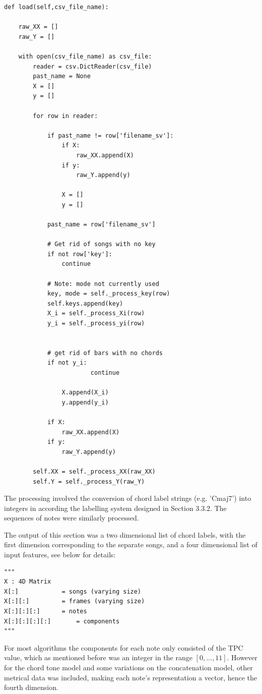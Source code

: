 \documentclass[bsc,singlespacing,parskip,deptreport,twoside,frontabs]{infthesis}
\begin{document}
\begin{lstlisting}[frame=single,caption='Data Loader']
def load(self,csv_file_name):

	raw_XX = []
	raw_Y = []

	with open(csv_file_name) as csv_file:
		reader = csv.DictReader(csv_file)
		past_name = None
		X = []
		y = []

		for row in reader:
			
			if past_name != row['filename_sv']:
				if X:
					raw_XX.append(X)
				if y:
					raw_Y.append(y)

				X = []
				y = []

			past_name = row['filename_sv']

			# Get rid of songs with no key
			if not row['key']:
				continue

			# Note: mode not currently used
			key, mode = self._process_key(row)
			self.keys.append(key)
			X_i = self._process_Xi(row)
			y_i = self._process_yi(row)


			# get rid of bars with no chords
			if not y_i:					
            			continue

				X.append(X_i)
				y.append(y_i)

			if X:
				raw_XX.append(X)
			if y:
				raw_Y.append(y)

		self.XX = self._process_XX(raw_XX)
		self.Y = self._process_Y(raw_Y)
\end{lstlisting}

The processing involved the conversion of chord label strings (e.g. 'Cmaj7') into integers in according the labelling system designed in Section 3.3.2. The sequences of notes were similarly processed.

The output of this section was a two dimensional list of chord labels, with the first dimension corresponding to the separate songs, and a four dimensional list of input features, see below for details:

\begin{lstlisting}[frame=single,caption='Input dimensions']
"""
X :	4D Matrix
X[:]			= songs (varying size)
X[:][:] 		= frames (varying size)
X[:][:][:]		= notes
X[:][:][:][:]		= components
"""
\end{lstlisting}

For most algorithms the components for each note only consisted of the TPC value, which as mentioned before was an integer in the range $[0,...,11]$. However for the chord tone model and some variations on the concatenation model, other metrical data was included, making each note's representation a vector, hence the fourth dimension.
\end{document}

